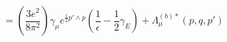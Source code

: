 \begin{equation}= \left(\frac{3e^{2}}{8\pi^{2}}\right)\gamma_{\mu}e^{\frac{i}{2}p'\wedge
p}\left(\frac{1}{\epsilon}-\frac{1}{2}\gamma_{E}\right)+\Lambda^{(b)\ast}_{\mu}(p,q,p')
\end{equation}

